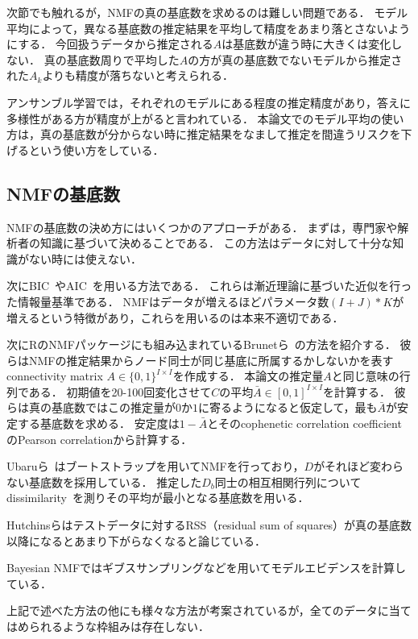次節でも触れるが，NMFの真の基底数を求めるのは難しい問題である．
モデル平均によって，異なる基底数の推定結果を平均して精度をあまり落とさないようにする．
今回扱うデータから推定される$A$は基底数が違う時に大きくは変化しない．
真の基底数周りで平均した$A$の方が真の基底数でないモデルから推定された$A_k$よりも精度が落ちないと考えられる．

アンサンブル学習では，それぞれのモデルにある程度の推定精度があり\cite{Kittler1998}，答えに多様性がある方が精度が上がる\cite{Kuncheva2006}と言われている．
本論文でのモデル平均の使い方は，真の基底数が分からない時に推定結果をなまして推定を間違うリスクを下げるという使い方をしている．

\subsection{NMFの基底数}
NMFの基底数の決め方にはいくつかのアプローチがある．
まずは，専門家や解析者の知識に基づいて決めることである．
この方法はデータに対して十分な知識がない時には使えない．

次にBIC~\cite{wasserman2000a}やAIC~\cite{Akaike1974}を用いる方法である．
これらは漸近理論に基づいた近似を行った情報量基準である．
NMFはデータが増えるほどパラメータ数$(I + J) * K$が増えるという特徴があり，これらを用いるのは本来不適切である．

次にRのNMFパッケージにも組み込まれているBrunetら~\cite{Brunet2004}の方法を紹介する．
彼らはNMFの推定結果からノード同士が同じ基底に所属するかしないかを表すconnectivity matrix $A \in \{0, 1\}^{I \times I}$を作成する．
本論文の推定量$A$と同じ意味の行列である．
初期値を20-100回変化させて$C$の平均$\bar{A} \in [0, 1]^{I \times I}$を計算する．
彼らは真の基底数ではこの推定量が$0$か$1$に寄るようになると仮定して，最も$\bar{A}$が安定する基底数を求める．
安定度は$1- \bar{A}$とそのcophenetic correlation coefficientのPearson correlationから計算する．

Ubaruら~\cite{Ubaru2017}はブートストラップを用いてNMFを行っており，$D$がそれほど変わらない基底数を採用している．
推定した$D_b$同士の相互相関行列についてdissimilarity~\cite{Wu}を測りその平均が最小となる基底数を用いる．

Hutchinsらはテストデータに対するRSS（residual sum of squares）が真の基底数以降になるとあまり下がらなくなると論じている\cite{Hutchins2008}．

Bayesian NMFではギブスサンプリングなどを用いてモデルエビデンスを計算している\cite{Cemgil2009}．

上記で述べた方法の他にも様々な方法が考案されているが，全てのデータに当てはめられるような枠組みは存在しない．


